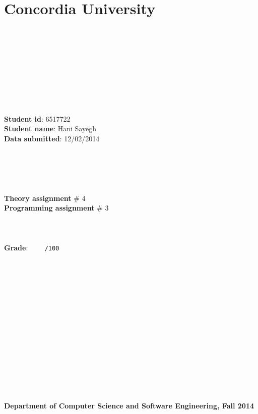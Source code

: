 \documentclass{article}
\begin{document}
	\section*{Concordia University}
	\hfill \\\hfill \\\hfill
	{}

	\hfill \\
	\hfill \\
	\hfill \\\hfill \\
	\hfill \\\hfill \\
	\noindent \textbf{Student id}: 6517722\\
	\textbf{Student name}: Hani Sayegh\\
	\textbf{Data submitted}: 12/02/2014\\
	\hfill \\
	\hfill \\\hfill \\
	\hfill \\\hfill \\
	\textbf{Theory assignment} \# 4\\
	\textbf{Programming assignment} \# 3\\
	\hfill \\
	\hfill \\\hfill \\
	\textbf{Grade}: \verb|    /100|
	\hfill \\\hfill \\
	\hfill \\\hfill \\
	\hfill \\\hfill \\
	\hfill \\\hfill \\
	\hfill \\\hfill \\
	\hfill \\\hfill \\
	\hfill \\\hfill \\
	\hfill \\\hfill \\
	\textbf{Department of Computer Science and Software Engineering, Fall 2014}
\end{document}
